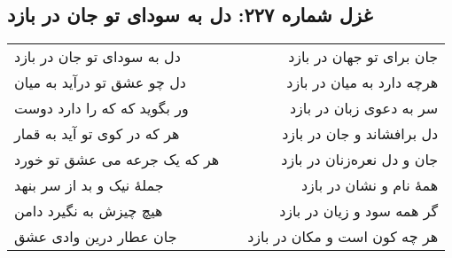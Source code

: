\begin{center}
\section*{غزل شماره ۲۲۷: دل به سودای تو جان در بازد}
\label{sec:227}
\begin{longtable}{l p{0.5cm} r}
دل به سودای تو جان در بازد
&&
جان برای تو جهان در بازد
\\
دل چو عشق تو درآید به میان
&&
هرچه دارد به میان در بازد
\\
ور بگوید که که را دارد دوست
&&
سر به دعوی زبان در بازد
\\
هر که در کوی تو آید به قمار
&&
دل برافشاند و جان در بازد
\\
هر که یک جرعه می عشق تو خورد
&&
جان و دل نعره‌زنان در بازد
\\
جملهٔ نیک و بد از سر بنهد
&&
همهٔ نام و نشان در بازد
\\
هیچ چیزش به نگیرد دامن
&&
گر همه سود و زیان در بازد
\\
جان عطار درین وادی عشق
&&
هر چه کون است و مکان در بازد
\\
\end{longtable}
\end{center}
